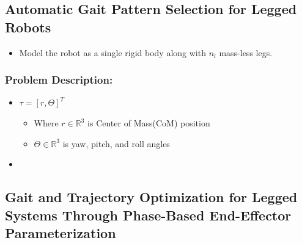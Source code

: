 \documentclass{article}
\theoremstyle{definition}
\theoremstyle{note}
\begin{document}
\subsection{Automatic  Gait  Pattern  Selection for  Legged  Robots}
\begin{itemize}
    \item Model the robot as a single rigid body along with $ n_ {l} $ mass-less legs.
\end{itemize}
\subsubsection{Problem Description:}

\begin{itemize}
    \item $ \tau = [r, \Theta]^ {T} $
        \begin{itemize}
            \item Where $ r \in \mathbb{R}^ {3}$ is Center of Mass(CoM) position    
            \item $ \Theta \in \mathbb{R}^ {3} $ is yaw, pitch, and roll angles
        \end{itemize}
    \item 
\end{itemize}



\subsection{Gait and Trajectory Optimization for Legged Systems Through Phase-Based End-Effector Parameterization}
\end{document}
